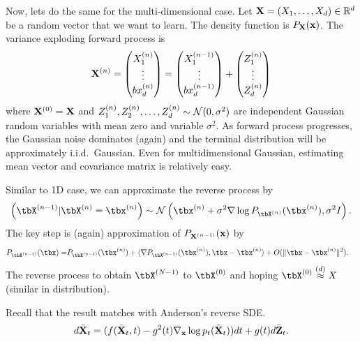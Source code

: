 \documentclass[11pt, a4paper]{article}
\begin{document}
Now, lets do the same for the multi-dimensional case.
Let ${\bf X}=(X_1, \dots, X_d)\in\mathbb{R}^d$ be a random vector that we want to learn.
The density function is $P_{{\bf X}}({\bf x})$.
The variance exploding forward process is 
\begin{align}
    {\bf X}^{(n)} = \begin{pmatrix} X^{(n)}_1 \\ \vdots\\bx^{(n)}_d \end{pmatrix}
    = \begin{pmatrix} X^{(n-1)}_1 \\ \vdots\\bx^{(n-1)}_d \end{pmatrix}
    + \begin{pmatrix} Z^{(n)}_1 \\ \vdots \\ Z^{(n)}_d \end{pmatrix}
\end{align}
where ${\bf X}^{(0)} = {\bf X}$ and $Z^{(n)}_1, Z^{(n)}_2, \dots, Z^{(n)}_d\sim{\cal N}(0, \sigma^2)$ are independent Gaussian random variables 
with mean zero and variable $\sigma^2$.
As forward process progresses, the Gaussian noise dominates (again) and the terminal distribution will be approximately i.i.d.~Gaussian.
Even for multidimensional Gaussian, estimating mean vector and covariance matrix is relatively easy.


Similar to 1D case, we can approximate the reverse process by
\begin{align}
    \left(\tbX^{(n-1)} | \tbX^{(n)}=\tbx^{(n)} \right)\sim \cN\left(\tbx^{(n)} + \sigma^2 \nabla \log P_{\tbX^{(n)}}(\tbx^{(n)}), \sigma^2 I\right).
\end{align}
The key step is (again) approximation of $P_{{\bf X}^{(n-1)}}({\bf x})$ by 
\begin{align}
    P_{\tbX^{(n-1)}}(\tbx) =& P_{\tbX^{(n-1)}}(\tbx^{(n)}) + \langle \nabla P_{\tbX^{(n-1)}}(\tbx^{(n)}), \tbx-\tbx^{(n)}\rangle + O(\|\tbx-\tbx^{(n)}\|^2).
\end{align}
The reverse process to obtain $\tbX^{(N-1)}$ to $\tbX^{(0)}$ 
and hoping $\tbX^{(0)} \stackrel{(d)}{\approx} X$ (similar in distribution).

Recall that the result matches with Anderson's reverse SDE.
\begin{align}
    d\bar{{\bf X}}_t = (f(\bar{{\bf X}}_t, t) - g^2(t) \nabla_{{\bf x}}\log p_t(\bar{{\bf X}}_t))dt+g(t) d\bar{{\bf Z}}_t.
\end{align}
\end{document}
